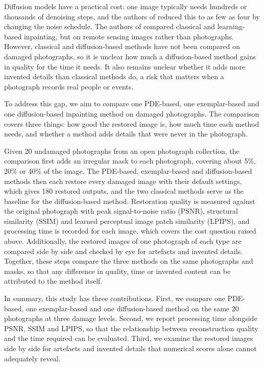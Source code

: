 \documentclass[conference]{IEEEtran}
\begin{document}
Diffusion models have a practical cost: one image typically needs hundreds or thousands of denoising steps, and the authors of \cite{yue2025} reduced this to as few as four by changing the noise schedule. The authors of \cite{sekrecka2025} compared classical and learning-based inpainting, but on remote sensing images rather than photographs. However, classical and diffusion-based methods have not been compared on damaged photographs, so it is unclear how much a diffusion-based method gains in quality for the time it needs. It also remains unclear whether it adds more invented details than classical methods do, a risk that matters when a photograph records real people or events.

To address this gap, we aim to compare one PDE-based, one exemplar-based and one diffusion-based inpainting method on damaged photographs. The comparison covers three things: how good the restored image is, how much time each method needs, and whether a method adds details that were never in the photograph.

Given 20 undamaged photographs from an open photograph collection, the comparison first adds an irregular mask to each photograph, covering about 5\%, 20\% or 40\% of the image. The PDE-based, exemplar-based and diffusion-based methods then each restore every damaged image with their default settings, which gives 180 restored outputs, and the two classical methods serve as the baseline for the diffusion-based method. Restoration quality is measured against the original photograph with peak signal-to-noise ratio (PSNR), structural similarity (SSIM) and learned perceptual image patch similarity (LPIPS), and processing time is recorded for each image, which covers the cost question raised above. Additionally, the restored images of one photograph of each type are compared side by side and checked by eye for artefacts and invented details. Together, these steps compare the three methods on the same photographs and masks, so that any difference in quality, time or invented content can be attributed to the method itself.

In summary, this study has three contributions. First, we compare one PDE-based, one exemplar-based and one diffusion-based method on the same 20 photographs at three damage levels. Second, we report processing time alongside PSNR, SSIM and LPIPS, so that the relationship between reconstruction quality and the time required can be evaluated. Third, we examine the restored images side by side for artefacts and invented details that numerical scores alone cannot adequately reveal.
\end{document}
